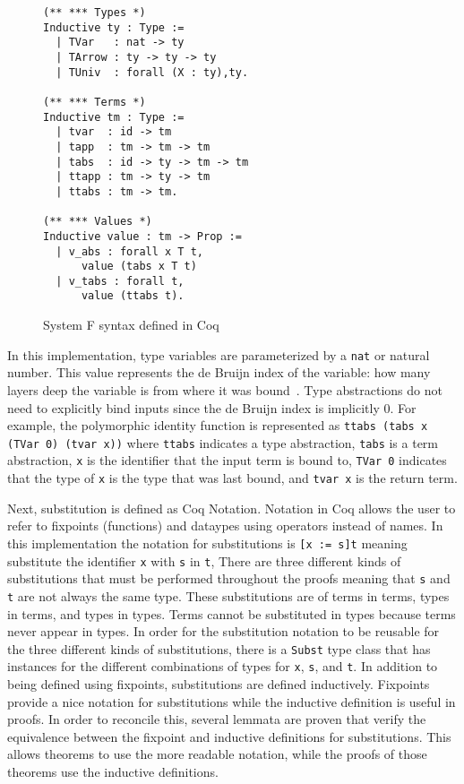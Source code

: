 \documentclass{sig-alternate}
\begin{document}
\begin{figure}[ht]
\begin{lstlisting}
(** *** Types *)
Inductive ty : Type := 
  | TVar   : nat -> ty 
  | TArrow : ty -> ty -> ty
  | TUniv  : forall (X : ty),ty.

(** *** Terms *)
Inductive tm : Type :=
  | tvar  : id -> tm
  | tapp  : tm -> tm -> tm
  | tabs  : id -> ty -> tm -> tm
  | ttapp : tm -> ty -> tm
  | ttabs : tm -> tm.

(** *** Values *)
Inductive value : tm -> Prop :=
  | v_abs : forall x T t,
      value (tabs x T t)
  | v_tabs : forall t,
      value (ttabs t).

\end{lstlisting}
\caption{System F syntax defined in Coq}
\label{fig:syntax-coq}
\end{figure}
In this implementation, type variables are parameterized by a \texttt{nat} or natural number. This value represents the de Bruijn index of the variable: how many layers deep the variable is from where it was bound~\cite{Vouillon12}. Type abstractions do not need to explicitly bind inputs since the de Bruijn index is implicitly 0. For example, the polymorphic identity function is represented as \texttt{ttabs (tabs x (TVar 0) (tvar x))} where \texttt{ttabs} indicates a type abstraction, \texttt{tabs} is a term abstraction, \texttt{x} is the identifier that the input term is bound to, \texttt{TVar 0} indicates that the type of \texttt{x} is the type that was last bound, and \texttt{tvar x} is the return term.

Next, substitution is defined as Coq Notation. Notation in Coq allows the user to refer to fixpoints (functions) and dataypes using operators instead of names. In this implementation the notation for substitutions is \texttt{[x := s]t} meaning substitute the identifier \texttt{x} with \texttt{s} in \texttt{t}, There are three different kinds of substitutions that must be performed throughout the proofs meaning that \texttt{s} and \texttt{t} are not always the same type. These substitutions are of terms in terms, types in terms, and types in types. Terms cannot be substituted in types because terms never appear in types. In order for the substitution notation to be reusable for the three different kinds of substitutions, there is a \texttt{Subst} type class that has instances for the different combinations of types for \texttt{x}, \texttt{s}, and \texttt{t}. In addition to being defined using fixpoints, substitutions are defined inductively. Fixpoints provide a nice notation for substitutions while the inductive definition is useful in proofs. In order to reconcile this, several lemmata are proven that verify the equivalence between the fixpoint and inductive definitions for substitutions. This allows theorems to use the more readable notation, while the proofs of those theorems use the inductive definitions.
\end{document}

